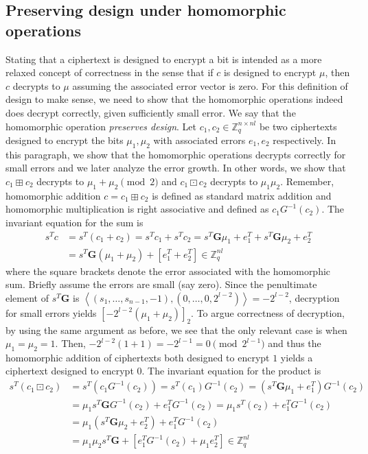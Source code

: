 \subsection*{Preserving design under homomorphic operations}
Stating that a ciphertext is designed to encrypt a bit is intended as a more relaxed concept of correctness in the sense that if $c$ is designed to encrypt $\mu$, then $c$ decrypts to $\mu$ assuming the associated error vector is zero. For this definition of design to make sense, we need to show that the homomorphic operations indeed does decrypt correctly, given sufficiently small error. We say that the homomorphic operation \textit{preserves design}.
Let $c_1, c_2 \in \mathbb{Z}_q^{n \times nl}$ be two ciphertexts designed to encrypt the bits $\mu_1, \mu_2$ with associated errors $e_1, e_2$ respectively. In this paragraph, we show that the homomorphic operations decrypts correctly for small errors and we later analyze the error growth. In other words, we show that $c_1 \boxplus c_2$ decrypts to $\mu_1 + \mu_2 \pmod 2$ and $c_1 \boxdot c_2$ decrypts to $\mu_1 \mu_2$. Remember, homomorphic addition $c = c_1 \boxplus c_2$ is defined as standard matrix addition and homomorphic multiplication is right associative and defined as $c_1 G^{-1}(c_2)$. The invariant equation for the sum is
\begin{equation}\label{eq:invariant_sum}
    \begin{aligned}
    s^Tc &= s^T(c_1 + c_2) = s^Tc_1 + s^Tc_2 = s^T \mathbf{G}\mu_1 + e_1^T + s^T \mathbf{G} \mu_2 + e_2^T \\
    &= s^T\mathbf{G}(\mu_1 + \mu_2) + [e_1^T + e_2^T] \in \mathbb{Z}_q^{nl}    
    \end{aligned}
\end{equation}
where the square brackets denote the error associated with the homomorphic sum. Briefly assume the errors are small (say zero). Since the penultimate element of $s^T\mathbf{G}$ is $\left \langle (s_1, \dots, s_{n-1}, -1),(0, \dots, 0, 2^{l-2} ) \right \rangle = -2^{l-2}$, decryption for small errors yields $[-2^{l-2}(\mu_1 + \mu_2)]_2$. To argue correctness of decryption, by using the same argument as before, we see that the only relevant case is when $\mu_1 = \mu_2 = 1$. Then, $-2^{l-2}(1 + 1) = - 2^{l-1} = 0 \pmod {2^{l-1}}$ and thus the homomorphic addition of ciphertexts both designed to encrypt $1$ yields a ciphertext designed to encrypt $0$.
The invariant equation for the product is
\begin{equation}\label{eq:invariant_product}
    \begin{aligned}
    s^T(c_1 \boxdot c_2) &= s^T(c_1 G^{-1}(c_2)) = s^T(c_1)G^{-1}(c_2) = (s^T\mathbf{G}\mu_1 + e_1^T)G^{-1}(c_2) \\
    &= \mu_1 s^T \mathbf{G}G^{-1}(c_2) + e_1^TG^{-1}(c_2) = \mu_1 s^T(c_2) + e_1^TG^{-1}(c_2) \\
    &= \mu_1(s^T\mathbf{G}\mu_2 + e_2^T) + e_1^TG^{-1}(c_2)\\
    &= \mu_1\mu_2 s^T\mathbf{G} + [e_1^TG^{-1}(c_2) + \mu_1 e_2^T] \in \mathbb{Z}_q^{nl}
    \end{aligned}
\end{equation}
